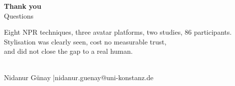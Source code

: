 \documentclass[aspectratio=169,10pt]{beamer}
\begin{document}
\begin{frame}[plain]
  \vspace{2.2em}
  \begin{center}
    {\LARGE\bfseries\color{knblue} Thank you}\\[1.2em]
    {\large\color{kngrey} Questions}\\[2.0em]
    \colorbox{knlight}{\parbox{0.78\textwidth}{\centering\color{knblue}\small
    Eight NPR techniques, three avatar platforms, two studies, 86 participants.\\[0.6em]
    Stylisation was clearly seen, cost no measurable trust,\\ and did not close the gap to a real human.}}\\[1.6em]
    {\footnotesize\color{kngrey} Nidanur Günay \quad|\quad nidanur.guenay@uni-konstanz.de}
  \end{center}
\end{frame}

\end{document}
